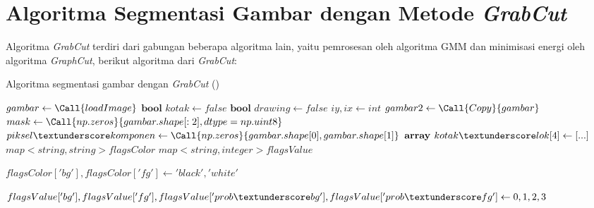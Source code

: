 \section{Algoritma Segmentasi Gambar dengan Metode \emph{GrabCut}}

Algoritma \emph{GrabCut} terdiri dari gabungan beberapa algoritma lain, yaitu 
pemrosesan oleh algoritma GMM dan minimisasi energi oleh algoritma \emph{GraphCut},
berikut algoritma dari \emph{GrabCut}:  

\begin{algorithm}                     
\caption{Algoritma segmentasi gambar dengan \emph{GrabCut} (\cite{Rother:2004})}          
\label{algo:grabcut}                          
\begin{algorithmic}                    %
    \State $gambar \gets \Call{loadImage}$  
    \State $\textbf{bool } kotak \gets false$ 
    \State $\textbf{bool } drawing \gets false$ 
    \State $iy, ix \gets int$
    \State $gambar2 \gets \Call{Copy}{gambar}$
    \State $mask \gets \Call{np.zeros}{gambar.shape[:2], dtype=np.uint8}$    
    \State $piksel\textunderscore komponen \gets \Call{np.zeros}{gambar.shape[0], gambar.shape[1]}$
    \State $\textbf{array } kotak\textunderscore lok[4] \gets [...]$
    \\
    \State $map<string, string> flagsColor$
    \State $map<string, integer> flagsValue$
    
    \State $flagsColor['bg'], flagsColor['fg']  \gets 'black', 'white'$

    \State $flagsValue['bg'], flagsValue['fg'], flagsValue['prob\textunderscore bg'], flagsValue['prob\textunderscore fg'] \newline
     \gets 0, 1, 2, 3$


\end{algorithmic}
\end{algorithm}
